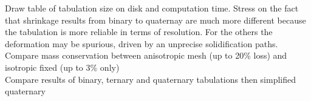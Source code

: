 Draw table of tabulation size on disk and computation time. Stress on the fact that shrinkage results from binary to quaternay are much more different because
the tabulation is more reliable in terms of resolution. For the others the deformation may be spurious, driven by an unprecise solidification paths. \\
Compare mass conservation between anisotropic mesh (up to 20\% loss) and isotropic fixed (up to 3\% only) \\
Compare results of binary, ternary and quaternary tabulations then simplified quaternary \\
 


